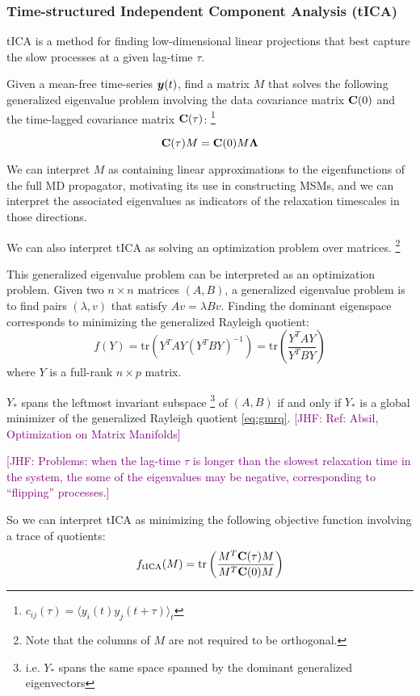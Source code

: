 \documentclass[aps,prl,preprint,nofootinbib,superscriptaddress,linenumbers]{revtex4-1}
\newcommand{\bfv}[1]{{\mbox{\boldmath{$#1$}}}}
\newcommand{\bfm}[1]{{\bf #1}}
\newcommand{\jhfcomment}[1]{\textcolor{purple}{[JHF: #1]}} 	%
\begin{document}
\subsubsection{Time-structured Independent Component Analysis (tICA)}
tICA is a method for finding low-dimensional linear projections that best capture the slow processes at a given lag-time $\tau$.

Given a mean-free time-series $\bfv{y}(t)$, find a matrix $M$ that solves the following generalized eigenvalue problem involving the data covariance matrix $\bfm{C}(0)$ and the time-lagged covariance matrix $\bfm{C}(\tau)$:
\footnote{$c_{ij}(\tau) = \langle y_i(t) y_j(t+\tau)\rangle_t$}

$$\bfm{C}(\tau) M = \bfm{C}(0) M \bfm{\Lambda}$$

We can interpret $M$ as containing linear approximations to the eigenfunctions of the full MD propagator, motivating its use in constructing MSMs, and we can interpret the associated eigenvalues as indicators of the relaxation timescales in those directions.

We can also interpret tICA as solving an optimization problem over matrices. \footnote{Note that the columns of $M$ are not required to be orthogonal.}

This generalized eigenvalue problem can be interpreted as an optimization problem. Given two $n\times n$ matrices $(A,B)$, a generalized eigenvalue problem is to find pairs $(\lambda,v)$ that satisfy $A v = \lambda B v$. Finding the dominant eigenspace corresponds to minimizing the generalized Rayleigh quotient:
\begin{equation} \label{eq:gmrq}
f(Y) = \text{tr}(Y^TAY(Y^TBY)^{-1}) = \text{tr}\left(\frac{Y^TAY}{Y^TBY}\right) 
\end{equation}
where $Y$ is a full-rank $n \times p$ matrix.

$Y_*$ spans the leftmost invariant subspace 
	\footnote{i.e. $Y_*$ spans the same space spanned by the dominant generalized eigenvectors}
of $(A,B)$ if and only if
$Y_*$ is a global minimizer of the generalized Rayleigh quotient \ref{eq:gmrq}. \jhfcomment{Ref: Absil, Optimization on Matrix Manifolds}


\jhfcomment{Problems: when the lag-time $\tau$ is longer than the slowest relaxation time in the system, the some of the eigenvalues may be negative, corresponding to ``flipping'' processes.}

So we can interpret tICA as minimizing the following objective function involving a trace of quotients:
$$ f_{\text{tICA}}(M) = \text{tr}\left(\frac{M^T \bfm{C}(\tau) M}{M^T \bfm{C}(0) M}\right) $$
\end{document}
